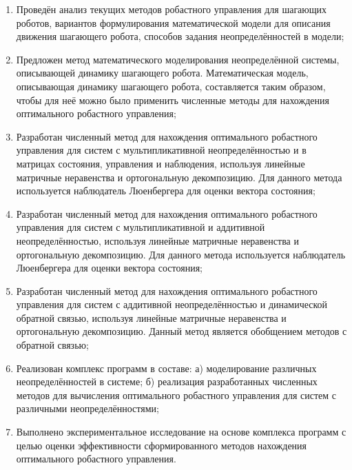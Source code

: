 \begin{enumerate}
  \item Проведён анализ текущих методов робастного управления для шагающих роботов, вариантов формулирования математической модели для описания движения шагающего робота, способов задания неопределённостей в модели;
  \item Предложен метод математического моделирования неопределённой системы, описывающей динамику шагающего робота. Математическая модель, описывающая динамику шагающего робота, составляется таким образом, чтобы для неё можно было применить численные методы для нахождения оптимального робастного управления;
  \item Разработан численный метод для нахождения оптимального робастного управления для систем с мультипликативной неопределённостью и в матрицах состояния, управления и наблюдения, используя линейные матричные неравенства и ортогональную декомпозицию. Для данного метода используется наблюдатель Люенбергера для оценки вектора состояния;
  \item Разработан численный метод для нахождения оптимального робастного управления для систем с мультипликативной и аддитивной неопределённостью, используя линейные матричные неравенства и ортогональную декомпозицию. Для данного метода используется наблюдатель Люенбергера для оценки вектора состояния;
  \item Разработан численный метод для нахождения оптимального робастного управления для систем с аддитивной неопределённостью и динамической обратной связью, используя линейные матричные неравенства и ортогональную декомпозицию. Данный метод является обобщением методов с обратной связью;
  \item Реализован комплекс программ в составе: а) моделирование различных неопределённостей в системе; б) реализация разработанных численных методов для вычисления оптимального робастного управления для систем с различными неопределённостями;
  \item Выполнено экспериментальное исследование на основе комплекса программ с целью оценки эффективности сформированного методов нахождения оптимального робастного управления.
\end{enumerate}
